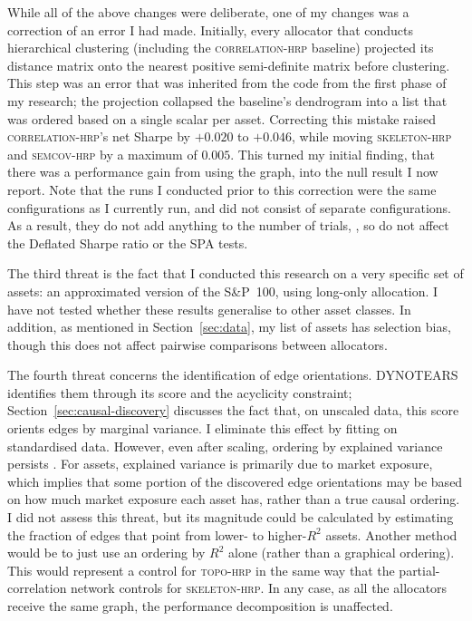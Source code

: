\documentclass[11pt, a4paper]{report}
\newcommand{\corrhrp}{\textsc{correlation-hrp}}
\newcommand{\skelhrp}{\textsc{skeleton-hrp}}
\newcommand{\semcovhrp}{\textsc{semcov-hrp}}
\newcommand{\topohrp}{\textsc{topo-hrp}}
\begin{document}
While all of the above changes were deliberate, one of my changes was a correction of an error I had made.
Initially, every allocator that conducts hierarchical clustering (including the \corrhrp{} baseline) projected its distance matrix onto the nearest positive semi-definite matrix before clustering. This step was an error that was inherited from the code from the first phase of my research; the projection collapsed the baseline's dendrogram into a list that was ordered based on a single scalar per asset.
Correcting this mistake raised \corrhrp{}'s net Sharpe by $+0.020$ to $+0.046$, while moving \skelhrp{} and \semcovhrp{} by a maximum of $0.005$. This turned my initial finding, that there was a performance gain from using the graph, into the null result I now report.
Note that the runs I conducted prior to this correction were the same configurations as I currently run, and did not consist of separate configurations. As a result, they do not add anything to the number of trials, \rsNtrials, so do not affect the Deflated Sharpe ratio or the SPA tests.

The third threat is the fact that I conducted this research on a very specific set of assets: an approximated version of the S\&P~100, using long-only allocation. I have not tested whether these results generalise to other asset classes. In addition, as mentioned in Section~\ref{sec:data}, my list of assets has selection bias, though this does not affect pairwise comparisons between allocators.

The fourth threat concerns the identification of edge orientations. DYNOTEARS
identifies them through its score and the acyclicity
constraint; Section~\ref{sec:causal-discovery} discusses the fact that, on unscaled data, this score
orients edges by marginal variance. I eliminate this effect by fitting on
standardised data. However, even after scaling, ordering by explained variance persists \cite{reisach2023r2}. For assets, explained variance is primarily due to market exposure, which implies that some portion of the discovered edge orientations may be based on how much market exposure each asset has, rather than a true causal ordering.
I did not assess this threat, but its magnitude could be calculated by estimating the fraction of edges that point from lower- to higher-$R^2$ assets. Another method would be to just use an ordering by $R^2$ alone (rather than a graphical ordering). This would represent a control for \topohrp{} in the same way that the partial-correlation
network controls for \skelhrp{}.
In any case, as all the allocators receive the same graph, the performance decomposition is unaffected.
\end{document}
